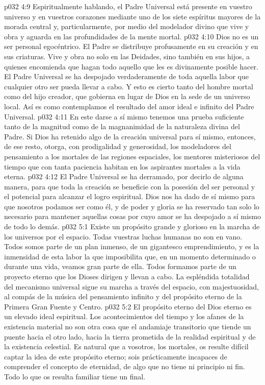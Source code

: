 \vs p032 4:9 \pc Espiritualmente hablando, el Padre Universal está presente en vuestro universo y en vuestros corazones mediante uno de los siete espíritus mayores de la morada central y, particularmente, por medio del modelador divino que vive y obra y aguarda en las profundidades de la mente mortal.
\vs p032 4:10 \pc Dios no es un ser personal egocéntrico. El Padre se distribuye profusamente en su creación y en sus criaturas. Vive y obra no solo en las Deidades, sino también en sus hijos, a quienes encomienda que hagan todo aquello que les es divinamente posible hacer. El Padre Universal se ha despojado verdaderamente de toda aquella labor que cualquier otro ser pueda llevar a cabo. Y esto es cierto tanto del hombre mortal como del hijo creador, que gobierna en lugar de Dios en la sede de un universo local. Así es como contemplamos el resultado del amor ideal e infinito del Padre Universal.
\vs p032 4:11 En este darse a sí mismo tenemos una prueba suficiente tanto de la magnitud como de la magnanimidad de la naturaleza divina del Padre. Si Dios ha retenido algo de la creación universal para sí mismo, entonces, de ese resto, otorga, con prodigalidad y generosidad, los modeladores del pensamiento a los mortales de las regiones espaciales, los mentores misteriosos del tiempo que con tanta paciencia habitan en los aspirantes mortales a la vida eterna.
\vs p032 4:12 El Padre Universal se ha derramado, por decirlo de alguna manera, para que toda la creación se beneficie con la posesión del ser personal y el potencial para alcanzar el logro espiritual. Dios nos ha dado de sí mismo para que nosotros podamos ser como él, y de poder y gloria se ha reservado tan solo lo necesario para mantener aquellas cosas por cuyo amor se ha despojado a sí mismo de todo lo demás.
\vs p032 5:1 Existe un propósito grande y glorioso en la marcha de los universos por el espacio. Todas vuestras luchas humanas no son en vano. Todos somos parte de un plan inmenso, de un gigantesco emprendimiento, y es la inmensidad de esta labor la que imposibilita que, en un momento determinado o durante una vida, veamos gran parte de ella. Todos formamos parte de un proyecto eterno que los Dioses dirigen y llevan a cabo. La espléndida totalidad del mecanismo universal sigue su marcha a través del espacio, con majestuosidad, al compás de la música del pensamiento infinito y del propósito eterno de la Primera Gran Fuente y Centro.
\vs p032 5:2 El propósito eterno del Dios eterno es un elevado ideal espiritual. Los acontecimientos del tiempo y los afanes de la existencia material no son otra cosa que el andamiaje transitorio que tiende un puente hacia el otro lado, hacia la tierra prometida de la realidad espiritual y de la existencia celestial. Es natural que a vosotros, los mortales, os resulte difícil captar la idea de este propósito eterno; sois prácticamente incapaces de comprender el concepto de eternidad, de algo que no tiene ni principio ni fin. Todo lo que os resulta familiar tiene un final.
